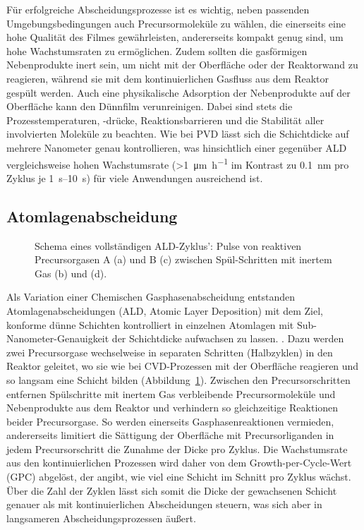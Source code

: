 Für erfolgreiche Abscheidungsprozesse ist es wichtig, neben passenden Umgebungsbedingungen auch Precursormoleküle zu wählen, die einerseits eine hohe Qualität des Filmes gewährleisten, andererseits kompakt genug sind, um hohe Wachstumsraten zu ermöglichen.
Zudem sollten die gasförmigen Nebenprodukte inert sein, um nicht mit der Oberfläche oder der Reaktorwand zu reagieren, während sie mit dem kontinuierlichen Gasfluss aus dem Reaktor gespült werden.
Auch eine physikalische Adsorption der Nebenprodukte auf der Oberfläche kann den Dünnfilm verunreinigen.
Dabei sind stets die Prozesstemperaturen, -drücke, Reaktionsbarrieren und die Stabilität aller involvierten Moleküle zu beachten.
Wie bei PVD lässt sich die Schichtdicke auf mehrere Nanometer genau kontrollieren, was hinsichtlich einer gegenüber ALD vergleichsweise hohen Wachstumsrate (\SI{>1}{\micro\meter\per\hour} im Kontrast zu \SI{0.1}{\nano\meter} pro Zyklus je \SIrange{1}{10}{\second}\cite{pierson_handbook_1999,puurunen_surface_2005}) für viele Anwendungen ausreichend ist.


\subsection{Atomlagenabscheidung}

\begin{figure}
  \centering
  \def\svgwidth{\textwidth}
  
  \caption[Schema eines vollständigen ALD-Zyklus']{
    Schema eines vollständigen ALD-Zyklus':
    Pulse von reaktiven Precursorgasen A (a) und B (c) zwischen Spül-Schritten mit inertem Gas (b) und (d).
  }
  \label{fig:ald-schema}
\end{figure}

Als Variation einer Chemischen Gasphasenabscheidung entstanden Atomlagenabscheidungen (ALD, Atomic Layer Deposition) mit dem Ziel, konforme dünne Schichten kontrolliert in einzelnen Atomlagen mit Sub-Nanometer-Genauigkeit der Schichtdicke aufwachsen zu lassen\cite{suntola_method_1977,puurunen_surface_2005,elliott_atomic-scale_2012}.
.
Dazu werden zwei Precursorgase wechselweise in separaten Schritten (Halbzyklen) in den Reaktor geleitet, wo sie wie bei CVD-Prozessen mit der Oberfläche reagieren und so langsam eine Schicht bilden (Abbildung~\ref{fig:ald-schema}).
Zwischen den Precursorschritten entfernen Spülschritte mit inertem Gas verbleibende Precursormoleküle und Nebenprodukte aus dem Reaktor und verhindern so gleichzeitige Reaktionen beider Precursorgase.
So werden einerseits Gasphasenreaktionen vermieden, andererseits limitiert die Sättigung der Oberfläche mit Precursorliganden in jedem Precursorschritt die Zunahme der Dicke pro Zyklus.
Die Wachstumsrate aus den kontinuierlichen Prozessen wird daher von dem Growth-per-Cycle-Wert (GPC) abgelöst, der angibt, wie viel eine Schicht im Schnitt pro Zyklus wächst.
Über die Zahl der Zyklen lässt sich somit die Dicke der gewachsenen Schicht genauer als mit kontinuierlichen Abscheidungen steuern, was sich aber in langsameren Abscheidungsprozessen äußert.

